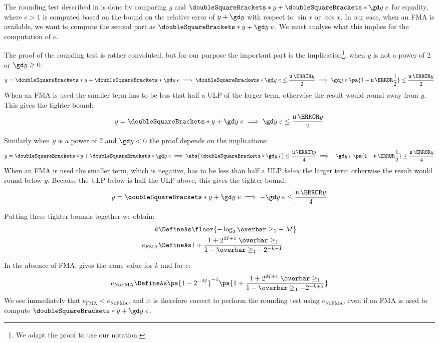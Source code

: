 \documentclass[10pt, a4paper, twoside]{basestyle}
\DeclareMathOperator{\ULP}{\mathfrak u}
\newcommand{\round}[1]{\doubleSquareBrackets*{#1}}
\begin{document}
The rounding test described in \cite[397-400]{MullerBrisebarreDeDinechinJeannerodLefevreMelquiondRevolStehleTorres2010} is done by comparing $y$ and $\round{y + \round{\gd y \; e}}$ for equality, where $e > 1$ is computed based on the bound on the relative error of $y + \gd y$ with respect to $\sin x$ or $\cos x$.  In our case, when an FMA is available, we want to compute the second part as $\round{y + \gd y \; e}$.  We must analyse what this implies for the computation of $e$.

The proof of the rounding test is rather convoluted, but for our purpose the important part is the implication\footnote{We adapt the proof to use our notation.}, when $y$ is not a power of 2 or $\gd y \geq 0$:
\[
y = \round{y + \round{\gd y \; e}} \implies \round{\gd y \; e} \le \frac{\ULP\of{y}}{2} \implies \gd y \; e \; \pa{1 - \ULP\of{\frac{1}{2}}} \le \frac{\ULP\of{y}}{2}
\]
When an FMA is used the smaller term has to be less that half a ULP of the larger term, otherwise the result would round away from $y$.  This gives the tighter bound:
\[
y = \round{y + \gd y \; e} \implies \gd y \; e \le \frac{\ULP\of{y}}{2}
\]

Similarly when $y$ is a power of 2 and $\gd y < 0$ the proof depends on the implications:
\[
y = \round{y + \round{\gd y \; e}} \implies \abs{\round{\gd y \; e}} \le \frac{\ULP\of{y}}{4} \implies -\gd y \; e \; \pa{1 - \ULP\of{\frac{1}{2}}} \le \frac{\ULP\of{y}}{4}
\]
When an FMA is used the smaller term, which is negative, has to be less than half a ULP \emph{below} the larger term otherwise the result would round below $y$.  Because the ULP below is half the ULP above, this gives the tighter bound:
\[
y = \round{y + \gd y \; e} \implies -\gd y \; e \le \frac{\ULP\of{y}}{4}
\]

Putting these tighter bounds together we obtain:
\begin{align*}
k &\DefineAs \floor{-\log_2{\overbar\ge_1} - M} \\
e_{\text{FMA}} &\DefineAs 1 + \frac{1 + 2^{M + 1} \; \overbar\ge_1}{1 - \overbar\ge_1 - 2^{-k + 1}}
\end{align*}

In the absence of FMA, \cite{MullerBrisebarreDeDinechinJeannerodLefevreMelquiondRevolStehleTorres2010} gives the same value for $k$ and for $e$:
\[
e_{\text{NoFMA}} \DefineAs \pa{1 - 2^{-M}}^{-1}\pa{1 + \frac{1 + 2^{M + 1} \; \overbar\ge_1}{1 - \overbar\ge_1 - 2^{-k + 1}}}
\]
We see immediately that $e_{\text{FMA}} < e_{\text{NoFMA}}$, and it is therefore correct to perform the rounding test using $e_{\text{NoFMA}}$, even if an FMA is used to compute $\round{y + \gd y \; e}$.
\end{document}
